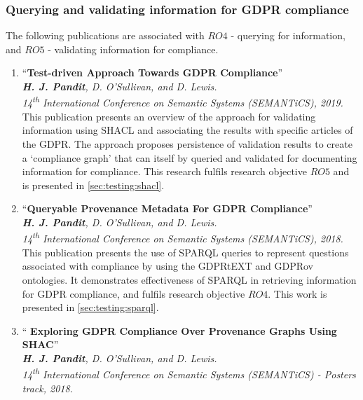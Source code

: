 \subsubsection{Querying and validating information for GDPR compliance}
The following publications are associated with $RO4$ - querying for information, and $RO5$ - validating information for compliance.
\begin{enumerate}[resume]
    \item ``\textbf{Test-driven Approach Towards GDPR Compliance}'' \cite{pandit_test-driven_2019} \\
    \textit{\textbf{H. J. Pandit}, D. O’Sullivan, and D. Lewis.} \\ 
    \textit{14\textsuperscript{th} International Conference on Semantic Systems (SEMANTiCS), 2019.}
        \vspace{0.1cm} \newline
        This publication presents an overview of the approach for validating information using SHACL and associating the results with specific articles of the GDPR. The approach proposes persistence of validation results to create a `compliance graph' that can itself by queried and validated for documenting information for compliance. This research fulfils research objective $RO5$ and is presented in \autoref{sec:testing:shacl}.
    \item ``\textbf{Queryable Provenance Metadata For GDPR Compliance}'' \cite{pandit_queryable_2018} \\
    \textit{\textbf{H. J. Pandit}, D. O’Sullivan, and D. Lewis.} \\ 
    \textit{14\textsuperscript{th} International Conference on Semantic Systems (SEMANTiCS), 2018.}
        \vspace{0.1cm} \newline
        This publication presents the use of SPARQL queries to represent questions associated with compliance by using the GDPRtEXT and GDPRov ontologies.
        It demonstrates effectiveness of SPARQL in retrieving information for GDPR compliance, and fulfils research objective $RO4$. This work is presented in \autoref{sec:testing:sparql}.
    \item ``\textbf{ Exploring GDPR Compliance Over Provenance Graphs Using SHAC}'' \cite{pandit_exploring_2018} \\
    \textit{\textbf{H. J. Pandit}, D. O’Sullivan, and D. Lewis.} \\ 
    \textit{14\textsuperscript{th} International Conference on Semantic Systems (SEMANTiCS) - Posters track, 2018.}

\end{enumerate}
